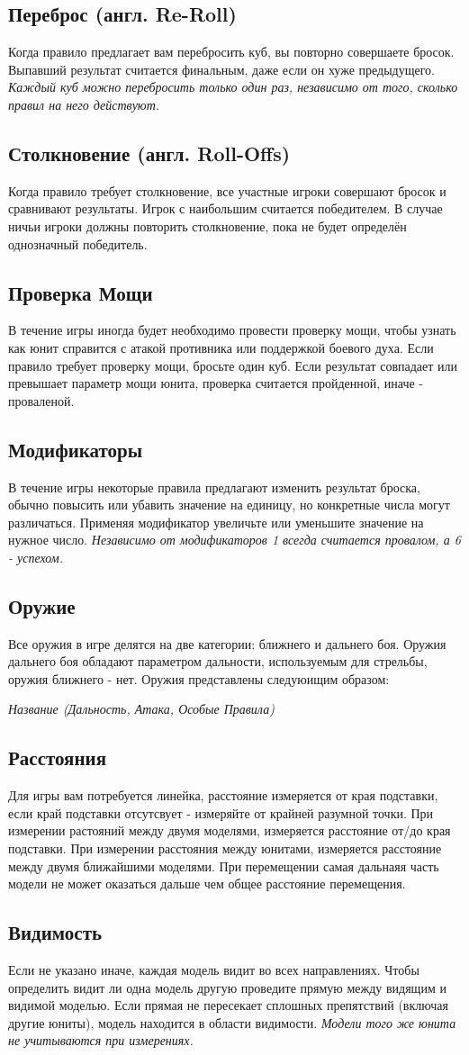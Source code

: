 \documentclass[twocolumn]{article}
\newcommand{\subsec}[1]{\subsection{#1}\label{subsec:#1}}
\begin{document}
\subsec{Переброс (англ. Re-Roll)}
Когда правило предлагает вам перебросить куб, вы повторно совершаете бросок. Выпавший результат считается финальным, даже если он хуже предыдущего. \emph{Каждый куб можно перебросить только один раз, независимо от того, сколько правил на него действуют.}

\subsec{Столкновение (англ. Roll-Offs)}
Когда правило требует столкновение, все участные игроки совершают бросок и сравнивают результаты. Игрок с наибольшим считается победителем. В случае ничьи игроки должны повторить столкновение, пока не будет определён однозначный победитель.

\subsec{Проверка Мощи}
В течение игры иногда будет необходимо провести проверку мощи, чтобы узнать как юнит справится с атакой противника или поддержкой боевого духа. Если правило требует проверку мощи, бросьте один куб. Если результат совпадает или превышает параметр мощи юнита, проверка считается пройденной, иначе - проваленой.

\subsec{Модификаторы}
В течение игры некоторые правила предлагают изменить результат броска, обычно повысить или убавить значение на единицу, но конкретные числа могут различаться. Применяя модификатор увеличьте или уменьшите значение на нужное число. \emph{Независимо от модификаторов 1 всегда считается провалом, а 6 - успехом.}

\subsec{Оружие}
Все оружия в игре делятся на две категории: ближнего и дальнего боя. Оружия дальнего боя обладают параметром дальности, используемым для стрельбы, оружия ближнего - нет. Оружия представлены следуюищим образом:
\begin{center}
    \textit{Название (Дальность, Атака, Особые Правила)}
\end{center}

\subsec{Расстояния}
Для игры вам потребуется линейка, расстояние измеряется от края подставки, если край подставки отсутсвует - измеряйте от крайней разумной точки. При измерении растояний между двумя моделями, измеряется расстояние от/до края подставки. При измерении расстояния между юнитами, измеряется расстояние между двумя ближайшими моделями. При перемещении самая дальнаяя часть модели не может оказаться дальше чем общее расстояние перемещения.

\subsec{Видимость}
Если не указано иначе, каждая модель видит во всех направлениях. Чтобы определить видит ли одна модель другую проведите прямую между видящим и видимой моделью. Если прямая не пересекает сплошных препятствий (включая другие юниты), модель находится в области видимости. \emph{Модели того же юнита не учитываются при измерениях.}
\end{document}

